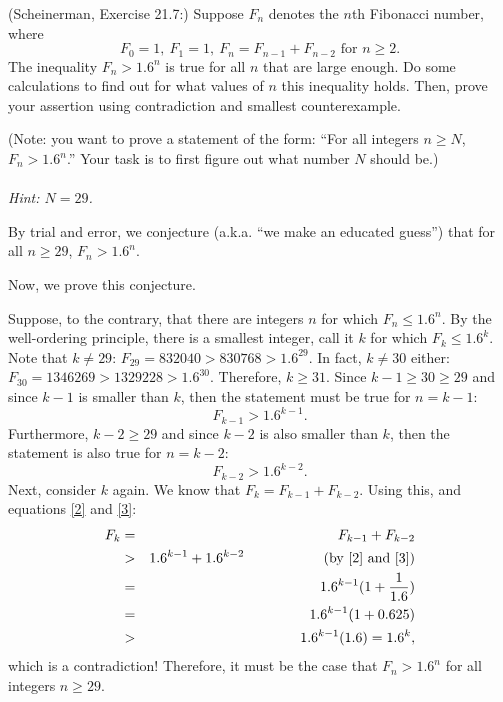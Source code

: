 \documentclass{article}
\theoremstyle{definition}
\begin{document}
\begin{question}
    (Scheinerman, Exercise 21.7:) 
    Suppose $F_n$ denotes the $n$th Fibonacci number, where
    \[ F_0 = 1, ~ F_1 = 1, ~ F_n = F_{n-1} + F_{n-2} \text{ for } n \geq 2.\]
    The inequality $F_n > 1.6^n$ is true for all $n$ that are large enough.  Do some calculations to find out for what values of $n$ this inequality holds.  Then, prove your assertion using contradiction and smallest counterexample.

    (Note: you want to prove a statement of the form: ``For all integers $n \geq N$, $F_n > 1.6^n$.''  Your task is to first figure out what number $N$ should be.)\\~\\
    \textit{Hint: $N=29$.}
\end{question}
\begin{solution}
By trial and error, we conjecture (a.k.a. ``we make an educated guess'') that for all $n \geq 29$, $F_n > 1.6^n$.

Now, we prove this conjecture.

Suppose, to the contrary, that there are integers $n$ for which $F_n \leq 1.6^n$. By the well-ordering principle, there is a smallest integer, call it $k$ for which $F_k \leq 1.6^k$. Note that $k \neq 29$: $F_{29} = 832040 > 830768 > 1.6^{29}$.  In fact, $k \neq 30$ either: $F_{30} = 1346269 > 1329228 > 1.6^{30}$. Therefore, $k \geq 31$. Since $k-1 \geq 30 \geq 29$ and since $k-1$ is smaller than $k$, then the statement must be true for $n = k-1$:
\begin{equation} F_{k-1} > 1.6^{k-1}. \label{2}\end{equation}
Furthermore, $k-2 \geq 29$ and since $k-2$ is also smaller than $k$, then the statement is also true for $n = k-2$:
\begin{equation} F_{k-2} > 1.6^{k-2}. \label{3} \end{equation}
 Next, consider $k$ again.  We know that $F_{k} = F_{k-1} + F_{k-2}$.  Using this, and equations \eqref{2} and \eqref{3}:
\begin{eqnarray*}
F_k & = & F_{k-1} + F_{k-2} \\
	& > & 1.6^{k-1} + 1.6^{k-2} \hspace{2cm} (\text{by \eqref{2} and \eqref{3}})\\
	& = & 1.6^{k-1} (1 + \frac{1}{1.6}) \\
	& = & 1.6^{k-1} (1 + 0.625) \\
	& > & 1.6^{k-1} (1.6) = 1.6^{k},
\end{eqnarray*}
which is a contradiction!
Therefore, it must be the case that $F_n > 1.6^n$ for all integers $n \geq 29$.
\end{solution}
\end{document}
